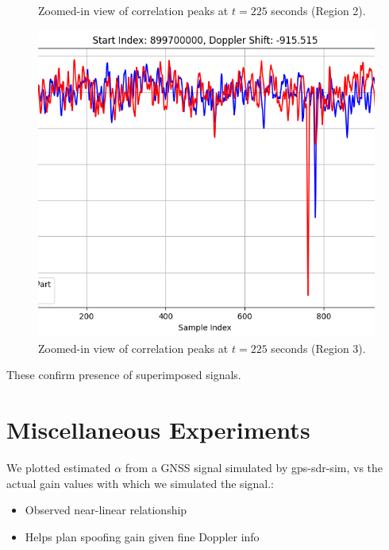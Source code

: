 \documentclass[12pt]{report}
\begin{document}
\begin{figure}[H]
\begin{minipage}{0.32\textwidth}
    \caption{Zoomed-in view of correlation peaks at $t = 225$ seconds (Region 2).}
    \label{fig:t225_z2}
  \end{minipage}
  \hfill
  \begin{minipage}{0.32\textwidth}
    \centering
    \includegraphics[width=\textwidth]{t225_z3.png}
    \caption{Zoomed-in view of correlation peaks at $t = 225$ seconds (Region 3).}
    \label{fig:t225_z3}
  \end{minipage}
\end{figure}

These confirm presence of superimposed signals.

\section{Miscellaneous Experiments}
We plotted estimated $\alpha$ from a GNSS signal simulated by gps-sdr-sim, vs the actual gain values with which we simulated the signal.:
\begin{itemize}
  \item Observed near-linear relationship
  \item Helps plan spoofing gain given fine Doppler info
\end{itemize}
\end{document}
